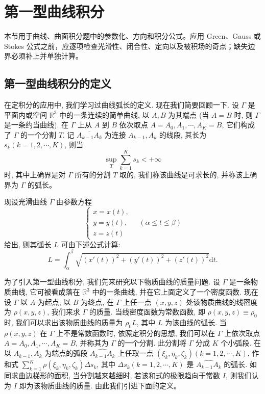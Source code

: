 \documentclass[UTF8,12pt,a4paper,fontset=fandol]{ctexart}
\begin{document}
\section{第一型曲线积分}\label{course-16-1}
本节用于曲线、曲面积分题中的参数化、方向和积分公式。应用 Green、Gauss 或 Stokes 公式之前，应逐项检查光滑性、闭合性、定向以及被积场的奇点；缺失边界必须补上并单独计算。

\subsection{第一型曲线积分的定义}

在定积分的应用中, 我们学习过曲线弧长的定义. 现在我们简要回顾一下. 设 $\Gamma$ 是平面内或空间 $\mathbb R^3$ 中的一条连续的简单曲线, 以 $A,B$ 为其端点 (当 $A=B$ 时, 则 $\Gamma$ 是一条约当曲线). 在 $\Gamma$ 上从 $A$ 到 $B$ 依次取点 $A=A_0,A_1,\cdots,A_K=B$, 它们构成了 $\Gamma$ 的一个分割 $T$. 记 $\overline{A_{k-1}A_k}$ 为连接 $A_{k-1},A_k$ 的线段, 其长为 $s_k(k=1,2,\cdots,K)$, 则当
\[
  \sup_T\sum_{k=1}^K s_k<+\infty
\]
时, 其中上确界是对 $\Gamma$ 所有的分割 $T$ 取的, 我们称该曲线是可求长的, 并称该上确界为 $\Gamma$ 的弧长。

现设光滑曲线 $\Gamma$ 由参数方程
\[
  \begin{cases}
    x=x(t),\\
    y=y(t),\\
    z=z(t)
  \end{cases}
  \quad(\alpha\leqslant t\leqslant \beta)
\]
给出, 则其弧长 $L$ 可由下述公式计算:
\[
  L=\int_\alpha^\beta \sqrt{(x'(t))^2+(y'(t))^2+(z'(t))^2}\mathrm dt.
\]

为了引入第一型曲线积分, 我们先来研究以下物质曲线的质量问题. 设 $\Gamma$ 是一条物质曲线, 它可被看成落在 $\mathbb R^3$ 中的一条曲线, 并在它上面定义了一个密度函数. 现在设 $\Gamma$ 以 $A$ 为起点, 以 $B$ 为终点, 在 $\Gamma$ 上任一点 $(x,y,z)$ 处该物质曲线的线密度为 $\rho(x,y,z)$, 我们来求 $\Gamma$ 的质量. 当线密度函数为常数函数, 即 $\rho(x,y,z)\equiv\rho_0$ 时, 我们可以求出该物质曲线的质量为 $\rho_0L$, 其中 $L$ 为该曲线的弧长. 当 $\rho(x,y,z)$ 在 $\Gamma$ 上不是常数函数时, 依照定积分的思想, 我们可以在 $\Gamma$ 上依次取点 $A=A_0,A_1,\cdots,A_K=B$, 并称其为 $\Gamma$ 的一个分割. 此分割将 $\Gamma$ 分成 $K$ 个小弧段. 在以 $A_{k-1},A_k$ 为端点的弧段 $\widehat{A_{k-1}A_k}$ 上任取一点 $(\xi_k,\eta_k,\zeta_k)(k=1,2,\cdots,K)$, 作和式 $\sum\limits_{k=1}^K \rho(\xi_k,\eta_k,\zeta_k)\Delta s_k$, 其中 $\Delta s_k(k=1,2,\cdots,K)$ 是 $\widehat{A_{k-1}A_k}$ 的弧长. 如同求曲边梯形的面积, 当分割越来越细时, 若该和式的极限趋向于常数 $I$, 则我们认为 $I$ 即为该物质曲线的质量. 由此我们引进下面的定义。
\end{document}
